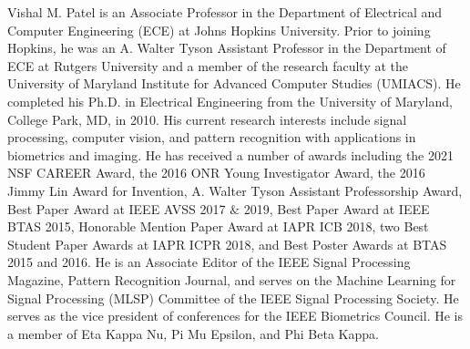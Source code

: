 \documentclass[journal]{IEEEtran}
\begin{document}
\begin{IEEEbiography}
{Vishal M. Patel}
\text{[SM'15]} is an Associate Professor in the Department of Electrical and Computer Engineering (ECE) at Johns Hopkins University. Prior to joining Hopkins, he was an A. Walter Tyson Assistant Professor in the Department of ECE at Rutgers University and a member of the research faculty at the University of Maryland Institute for Advanced Computer Studies (UMIACS). He completed his Ph.D. in Electrical Engineering from the University of Maryland, College Park, MD, in 2010.  His  current  research interests include signal processing, computer vision, and  pattern  recognition  with  applications  in  biometrics  and  imaging.    He has received a number of awards including the 2021 NSF CAREER Award, the 2016 ONR Young Investigator Award, the 2016 Jimmy Lin Award for Invention, A. Walter Tyson Assistant Professorship Award, Best Paper Award at IEEE AVSS 2017 $\&$ 2019, Best Paper Award at IEEE BTAS 2015, Honorable Mention Paper Award at IAPR ICB 2018, two Best Student Paper Awards at IAPR ICPR 2018, and Best Poster Awards at BTAS 2015 and 2016. He is an Associate Editor of the IEEE Signal Processing Magazine, Pattern Recognition Journal, and serves on the Machine Learning for Signal Processing (MLSP) Committee of the IEEE Signal Processing Society. He serves as the vice president of conferences for the IEEE Biometrics Council. He is a member of Eta Kappa Nu, Pi Mu Epsilon, and Phi Beta Kappa.
\end{IEEEbiography}
\end{document}
